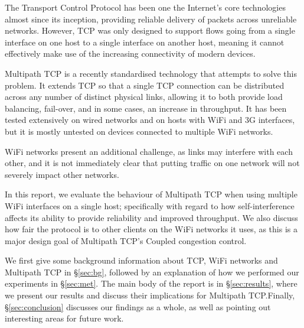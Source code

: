 The Transport Control Protocol has been one the Internet's core technologies almost since its inception, providing reliable delivery of packets across unreliable
networks. However, TCP was only designed to support flows going from a single
interface on one host to a single interface on another host, meaning it cannot
effectively make use of the increasing connectivity of modern devices.

Multipath TCP is a recently standardised technology that attempts to solve this
problem. It extends TCP so that a single TCP connection can be distributed
across any number of distinct physical links, allowing it to both provide load
balancing, fail-over, and in some cases, an increase in throughput. It has been
tested extensively on wired networks and on hosts with WiFi and 3G interfaces,
but it is mostly untested on devices connected to multiple WiFi networks.

WiFi networks present an additional challenge, as links may interfere with each
other, and it is not immediately clear that putting traffic on one network will
not severely impact other networks.

In this report, we evaluate the behaviour of Multipath TCP when using multiple
WiFi interfaces on a single host; specifically with regard to how
self-interference affects its ability to provide reliability and improved
throughput. We also discuss how fair the protocol is to other clients on the WiFi
networks it uses, as this is a major design goal of Multipath TCP's Coupled
congestion control.

We first give some background information about TCP, WiFi networks and Multipath
TCP in \S\ref{sec:bg}, followed by an explanation of how we performed our
experiments in \S\ref{sec:met}. The main body of the report is in
\S\ref{sec:results}, where we present our results and discuss their implications
for Multipath TCP.\@ Finally, \S\ref{sec:conclusion} discusses our findings as a
whole, as well as pointing out interesting areas for future work.
